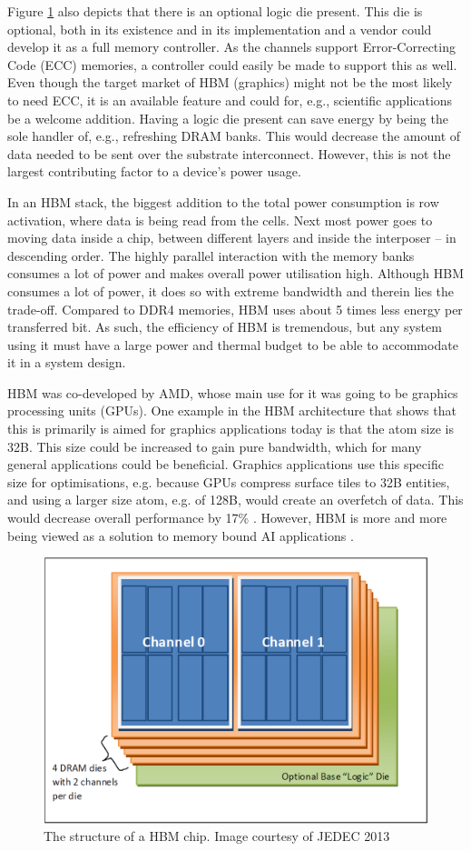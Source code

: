 Figure \ref{HBM-structure} also depicts that there is an optional logic die present. This die is optional, both in its existence and in its implementation and a vendor could develop it as a full memory controller. As the channels support Error-Correcting Code (ECC) memories, a controller could easily be made to support this as well. Even though the target market of HBM (graphics) might not be the most likely to need ECC, it is an available feature and could for, e.g., scientific applications be a welcome addition. Having a logic die present can save energy by being the sole handler of, e.g., refreshing DRAM banks. This would decrease the amount of data needed to be sent over the substrate interconnect. However, this is not the largest contributing factor to a device's power usage. 
\bigskip

In an HBM stack, the biggest addition to the total power consumption is row activation, where data is being read from the cells. Next most power goes to moving data inside a chip, between different layers and inside the interposer -- in descending order. The highly parallel interaction with the memory banks consumes a lot of power and makes overall power utilisation high. Although HBM consumes a lot of power, it does so with extreme bandwidth and therein lies the trade-off. Compared to DDR4 memories, HBM uses about 5 times less energy per transferred bit. As such, the efficiency of HBM is tremendous, but any system using it must have a large power and thermal budget to be able to accommodate it in a system design.
\bigskip

HBM was co-developed by AMD, whose main use for it was going to be graphics processing units (GPUs). One example in the HBM architecture that shows that this is primarily is aimed for graphics applications today is that the atom size is 32B. This size could be increased to gain pure bandwidth, which for many general applications could be beneficial. Graphics applications use this specific size for optimisations, e.g. because GPUs compress surface tiles to 32B entities, and using a larger size atom, e.g. of 128B, would create an overfetch of data. This would decrease overall performance by 17\% \cite{O'Connor:2017:FDE:3123939.3124545}. However, HBM is more and more being viewed as a solution to memory bound AI applications \cite{sperling_2019}.

\begin{figure}[!h]
\centering
\includegraphics[width=0.75\linewidth]{figure/HBM_structure.PNG}
\caption{The structure of a HBM chip. Image courtesy of JEDEC 2013 }
\label{HBM-structure}
\end{figure}

